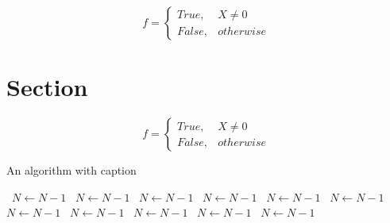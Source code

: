 \documentclass[a4paper]{article}
\begin{document}
\begin{equation}   f =
\begin{cases} True, & X \neq 0\\
False, & otherwise
\end{cases}
\end{equation}

\section{Section}

\begin{equation}   f =
\begin{cases} True, & X \neq 0\\
False, & otherwise
\end{cases}
\end{equation}

\begin{algorithm}
\caption{An algorithm with caption}
\begin{algorithmic}
\    \State $N \gets N - 1$
\    \State $N \gets N - 1$
\    \State $N \gets N - 1$
\    \State $N \gets N - 1$
\    \State $N \gets N - 1$
\    \State $N \gets N - 1$
\    \State $N \gets N - 1$
\    \State $N \gets N - 1$
\    \State $N \gets N - 1$
\    \State $N \gets N - 1$
\    \State $N \gets N - 1$
\EndWhile
\end{algorithmic}
\end{algorithm}
\end{document}
